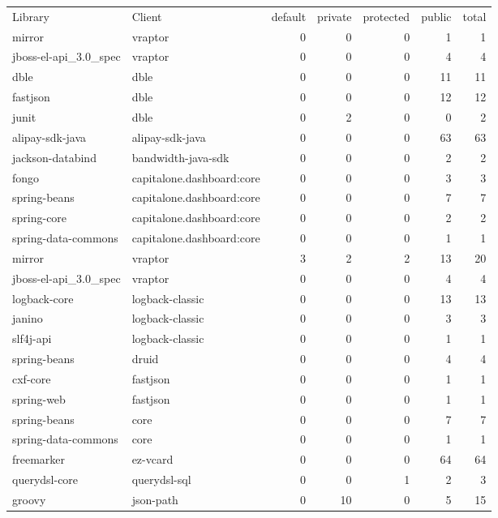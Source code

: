 \begin{table}[ht]
\centering
\begin{tabular}{ll!{\color{verylightgray}\vrule}rrrr!{\color{verylightgray}\vrule}r}
Library & Client & default & private & protected & public & total \\ 
  \hline
mirror & vraptor & 0 & 0 & 0 & 1 & 1 \\ 
  jboss-el-api\_3.0\_spec & vraptor & 0 & 0 & 0 & 4 & 4 \\ 
  dble & dble & 0 & 0 & 0 & 11 & 11 \\ 
  fastjson & dble & 0 & 0 & 0 & 12 & 12 \\ 
  junit & dble & 0 & 2 & 0 & 0 & 2 \\ 
  alipay-sdk-java & alipay-sdk-java & 0 & 0 & 0 & 63 & 63 \\ 
  jackson-databind & bandwidth-java-sdk & 0 & 0 & 0 & 2 & 2 \\ 
  fongo & capitalone.dashboard:core & 0 & 0 & 0 & 3 & 3 \\ 
  spring-beans & capitalone.dashboard:core & 0 & 0 & 0 & 7 & 7 \\ 
  spring-core & capitalone.dashboard:core & 0 & 0 & 0 & 2 & 2 \\ 
  spring-data-commons & capitalone.dashboard:core & 0 & 0 & 0 & 1 & 1 \\ 
  mirror & vraptor & 3 & 2 & 2 & 13 & 20 \\ 
  jboss-el-api\_3.0\_spec & vraptor & 0 & 0 & 0 & 4 & 4 \\ 
  logback-core & logback-classic & 0 & 0 & 0 & 13 & 13 \\ 
  janino & logback-classic & 0 & 0 & 0 & 3 & 3 \\ 
  slf4j-api & logback-classic & 0 & 0 & 0 & 1 & 1 \\ 
  spring-beans & druid & 0 & 0 & 0 & 4 & 4 \\ 
  cxf-core & fastjson & 0 & 0 & 0 & 1 & 1 \\ 
  spring-web & fastjson & 0 & 0 & 0 & 1 & 1 \\ 
  spring-beans & core & 0 & 0 & 0 & 7 & 7 \\ 
  spring-data-commons & core & 0 & 0 & 0 & 1 & 1 \\ 
  freemarker & ez-vcard & 0 & 0 & 0 & 64 & 64 \\ 
  querydsl-core & querydsl-sql & 0 & 0 & 1 & 2 & 3 \\ 
  groovy & json-path & 0 & 10 & 0 & 5 & 15 \\ 

\end{tabular}
\end{table}
